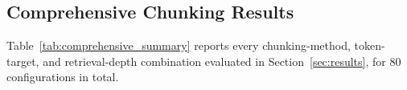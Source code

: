 \documentclass[pdflatex,sn-mathphys-num]{sn-jnl}
\theoremstyle{thmstyleone}
\theoremstyle{thmstyletwo}
\theoremstyle{thmstylethree}
\begin{document}
\begin{appendices}
\section{Comprehensive Chunking Results}\label{appendix:chunking}

Table~\ref{tab:comprehensive_summary} reports every chunking-method, token-target, and retrieval-depth combination evaluated in Section~\ref{sec:results}, for 80 configurations in total.

\begin{table}
\caption{Comprehensive chunking and retrieval summary across methods, token targets, and $k$ values. Latency in ms and build and index times in s.}
\label{tab:comprehensive_summary}


\end{table}
\end{appendices}
\end{document}
